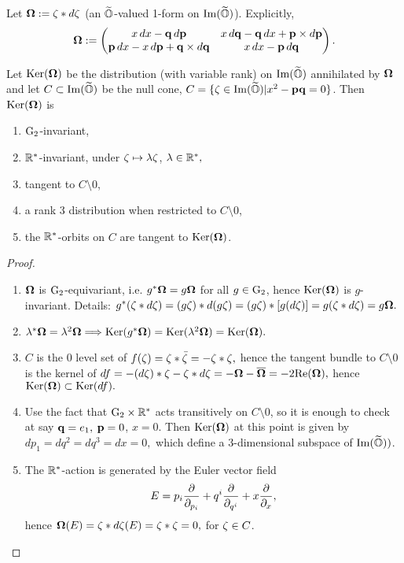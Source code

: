 \begin{definition} Let $\boldsymbol{\Omega}:=\zeta \ast d \zeta$ (an $\widetilde{\mathbb O}$-valued 1-form on ${\rm Im}(\widetilde{\mathbb O})$).  Explicitly, 
$$\boldsymbol{\Omega}:=
\left(\begin{matrix}
x\,dx-\mathbf q \,d{\mathbf p} & 
x\,d\mathbf q - \mathbf q \,dx+{\mathbf p}\times d{\mathbf p}\\  
 {\mathbf p}\, dx- x\,d{\mathbf p} +
 \mathbf q\times d\mathbf q&
x\,dx-{\mathbf p} \,d\mathbf q\end{matrix}\right).$$
\end{definition}



\begin{proposition}  Let  ${\rm Ker}(\boldsymbol{\Omega})$ be the distribution  (with variable rank) on ${\rm Im}(\widetilde{\mathbb O})$ annihilated by $\boldsymbol{\Omega}$ and  let $  C\subset {\rm Im}(\widetilde{\mathbb O})$ be the null cone, $C=\{\zeta\in{\rm Im}(\widetilde{\mathbb O})|x^2-{\mathbf p}\mathbf q=0 \}$. Then 
${\rm Ker}(\boldsymbol{\Omega})$  is
\begin{enumerate}
\item  ${\rm G}_2$-invariant,
\item  $\mathbb{R}^*$-invariant,  under     $\zeta\mapsto \lambda\zeta$, $\lambda\in\mathbb{R}^*,$ 
\item tangent to  $C\setminus 0$,
\item a rank 3 distribution when restricted to $C\setminus 0$,
\item the $\mathbb{R}^*$-orbits on $C$ are tangent to ${\rm Ker}(\boldsymbol{\Omega})$.


\end{enumerate}
\end{proposition} 


\begin{proof} 

\sn 


\begin{enumerate}
\item $\boldsymbol{\Omega}$ is ${\rm G}_2$-equivariant, i.e. $g^*\boldsymbol{\Omega}=g\boldsymbol{\Omega}$ for all $g\in {\rm G}_2$,  hence ${\rm Ker}(\boldsymbol{\Omega})$ is 
$g$-invariant. Details: $g^*(\zeta \ast d\zeta)=(g\zeta)\ast d(g\zeta)=(g\zeta)\ast [g(d\zeta)]=g(\zeta\ast d\zeta)=g\boldsymbol{\Omega}.$
\item $\lambda^*\boldsymbol{\Omega}=\lambda^2\boldsymbol{\Omega}\Longrightarrow {\rm Ker}(g^*\boldsymbol{\Omega})={\rm Ker}(\lambda^2\boldsymbol{\Omega})={\rm Ker}(\boldsymbol{\Omega}).$
\item $C$ is the 0 level set of $f(\zeta)=\zeta\ast \bar{\zeta}=-\zeta\ast \zeta,$ hence the tangent bundle to $C\setminus 0$ is the kernel of $df=-(d\zeta)\ast\zeta-\zeta \ast d \zeta=-\boldsymbol{\Omega}-\overline{\boldsymbol{\Omega}}=-2{\rm Re}(\boldsymbol{\Omega}),$ hence 
${\rm Ker}(\boldsymbol{\Omega})\subset{\rm Ker}(df).$


\item  Use the fact that ${\rm G}_2\times\mathbb{R}^*$ acts transitively on  $C\setminus 0$, so it is enough to check at say  $\mathbf q=e_1,$ ${\mathbf p}=0$,   $x=0$. Then ${\rm Ker}(\boldsymbol{\Omega})$ at this point is given by $dp_1=dq^2=dq^3=dx=0,$ which define a 3-dimensional subspace of ${\rm Im}(\widetilde{\mathbb O}))$. 
\item The $\mathbb{R}^*$-action is generated by the Euler vector field 
$$E=%
p_i{\partial\over\partial_{p_i}}+q^i{\partial\over\partial_{q^i}}+
x{\partial\over\partial_{x}},$$ hence
$\boldsymbol{\Omega}(E)=\zeta \ast d\zeta(E)=\zeta\ast\zeta=0,$ for $\zeta\in C$. 
\end{enumerate}
\end{proof} 



